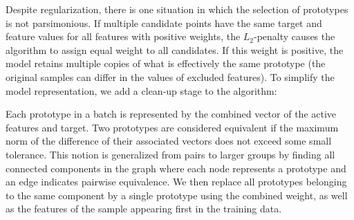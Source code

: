 %
Despite regularization, there is one situation in which the selection of prototypes is not parsimonious.
If multiple candidate points have the same target and feature values for all features with positive weights, the $L_2$-penalty causes the algorithm to assign equal weight to all candidates.
If this weight is positive, the model retains multiple copies of what is effectively the same prototype (the original samples can differ in the values of excluded features).
To simplify the model representation, we add a clean-up stage to the algorithm:\par
%
Each prototype in a batch is represented by the combined vector of the active features and target.
Two prototypes are considered equivalent if the maximum norm of the difference of their associated vectors does not exceed some small tolerance.
This notion is generalized from pairs to larger groups by finding all connected components in the graph where each node represents a prototype and an edge indicates pairwise equivalence.
We then replace all prototypes belonging to the same component by a single prototype using the combined weight, as well as the features of the sample appearing first in the training data.
%
